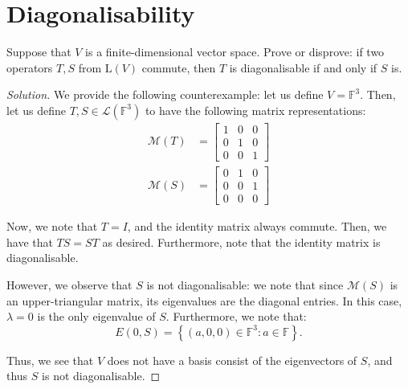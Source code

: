 \documentclass{article}
\newenvironment{solution}{\begin{proof}[Solution]}{\end{proof}}
\begin{document}
	\section{Diagonalisability}
	\begin{hw}
		Suppose that $V$ is a finite-dimensional vector space. Prove or disprove: if two operators $T,S$ from $\mathrm{L}(V)$ commute, then $T$ is diagonalisable if and only if $S$ is. 
	\end{hw}
	\begin{solution}
		We provide the following counterexample: let us define $V = \mathbb{F}^{3}$. Then, let us define $T, S \in \mathcal L(\mathbb{F}^{3})$ to have the following matrix representations:
		\begin{align*}
			\mathcal{M}(T) &= \begin{bmatrix}
				1 & 0 & 0 \\ 0 & 1 & 0 \\ 0 & 0 & 1
			\end{bmatrix} \\
			\mathcal{M}(S) &= \begin{bmatrix}
				0 & 1 & 0 \\ 0 & 0 & 1 \\ 0 & 0 & 0
			\end{bmatrix}
		\end{align*}
	
		Now, we note that $T = I$, and the identity matrix always commute. Then, we have that $TS = ST$ as desired. Furthermore, note that the identity matrix is diagonalisable.
		
		However, we observe that $S$ is not diagonalisable: we note that since $\mathcal{M}(S)$ is an upper-triangular matrix, its eigenvalues are the diagonal entries. In this case, $\lambda = 0$ is the only eigenvalue of $S$. Furthermore, we note that:
		\begin{equation*}
			E(0, S) = \left\{  (a,0,0) \in \mathbb{F}^{3} : a \in \mathbb{F} \right\}.
		\end{equation*}
	
		Thus, we see that $V$ does not have a basis consist of the eigenvectors of $S$, and thus $S$ is not diagonalisable.
	\end{solution}

	\newpage
	
\end{document}
